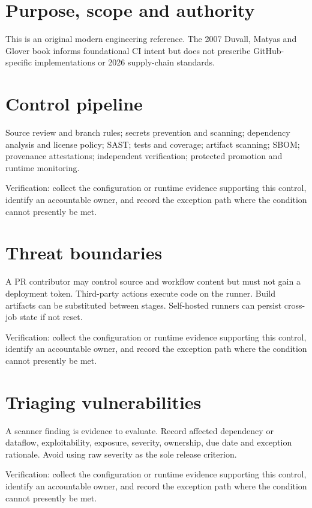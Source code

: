 \documentclass[11pt,letterpaper]{article}
\begin{document}
\makedoctitle
\makedocsummary
\tableofcontents
\clearpage
\section{Purpose, scope and authority}
This is an original modern engineering reference. The 2007 Duvall, Matyas and Glover book informs foundational CI intent but does not prescribe GitHub-specific implementations or 2026 supply-chain standards.

\section{Control pipeline}
Source review and branch rules; secrets prevention and scanning; dependency analysis and license policy; SAST; tests and coverage; artifact scanning; SBOM; provenance attestations; independent verification; protected promotion and runtime monitoring.

Verification: collect the configuration or runtime evidence supporting this control, identify an accountable owner, and record the exception path where the condition cannot presently be met.

\section{Threat boundaries}
A PR contributor may control source and workflow content but must not gain a deployment token. Third-party actions execute code on the runner. Build artifacts can be substituted between stages. Self-hosted runners can persist cross-job state if not reset.

Verification: collect the configuration or runtime evidence supporting this control, identify an accountable owner, and record the exception path where the condition cannot presently be met.

\section{Triaging vulnerabilities}
A scanner finding is evidence to evaluate. Record affected dependency or dataflow, exploitability, exposure, severity, ownership, due date and exception rationale. Avoid using raw severity as the sole release criterion.

Verification: collect the configuration or runtime evidence supporting this control, identify an accountable owner, and record the exception path where the condition cannot presently be met.
\end{document}

